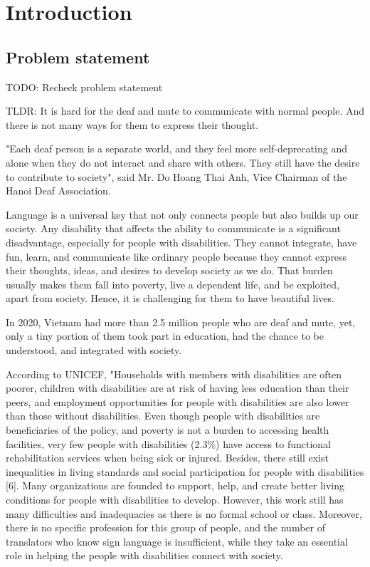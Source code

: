 \chapter {Introduction}
	
\section{Problem statement}

TODO: Recheck problem statement

TLDR: It is hard for the deaf and mute to communicate with normal people. And there is not many ways for them to express their thought.

"Each deaf person is a separate world, and they feel more self-deprecating and alone when they do not interact and share with others. They still have the desire to contribute to society", said Mr. Do Hoang Thai Anh, Vice Chairman of the Hanoi Deaf Association.

Language is a universal key that not only connects people but also builds up our society. Any disability that affects the ability to communicate is a significant disadvantage, especially for people with disabilities. They cannot integrate, have fun, learn, and communicate like ordinary people because they cannot express their thoughts, ideas, and desires to develop society as we do. That burden usually makes them fall into poverty, live a dependent life, and be exploited, apart from society. Hence, it is challenging for them to have beautiful lives.

In 2020, Vietnam had more than 2.5 million people who are deaf and mute, yet, only a tiny portion of them took part in education, had the chance to be understood, and integrated with society.

According to UNICEF, "Households with members with disabilities are often poorer, children with disabilities are at risk of having less education than their peers, and employment opportunities for people with disabilities are also lower than those without disabilities. Even though people with disabilities are beneficiaries of the policy, and poverty is not a burden to accessing health facilities, very few people with disabilities (2.3\%) have access to functional rehabilitation services when being sick or injured. Besides, there still exist inequalities in living standards and social participation for people with disabilities [6]. Many organizations are founded to support, help, and create better living conditions for people with disabilities to develop. However, this work still has many difficulties and inadequacies as there is no formal school or class. Moreover, there is no specific profession for this group of people, and the number of translators who know sign language is insufficient, while they take an essential role in helping the people with disabilities connect with society.

